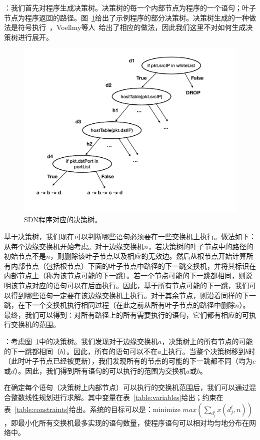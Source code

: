 ：我们首先对程序生成决策树。决策树的每一个内部节点为程序的一个语句；叶子节点为程序返回的路径。图~\ref{fig:dg}给出了示例程序的部分决策树。决策树生成的一种做法是符号执行~\cite{king1976symbolic}，Voellmy等人~\cite{magellan-poster}给出了相应的做法，因此我们这里不对如何生成决策树进行展开。

\begin{figure}[!htbp]
\includegraphics[width=0.8\linewidth]{figures/global-dt.pdf}
\centering
\caption{\small SDN程序对应的决策树。}
\label{fig:dg}
\end{figure}

基于决策树，我们现在可以判断哪些语句必须要在一些交换机上执行。做法如下：从每个边缘交换机开始考虑。对于边缘交换机$n$，若决策树的叶子节点中的路径的初始节点不是$n$，则删除该叶子节点以及相应的无效边。然后从根节点开始计算所有内部节点（包括根节点）下面的叶子节点中路径的下一跳交换机，并将其标识在内部节点上（称为该节点可能的下一跳）。若一个节点可能的下一跳都相同，则说明该节点对应的语句可以在后面执行。因此，基于所有节点可能的下一跳，我们可以得到哪些语句一定要在该边缘交换机上执行。对于其余节点，则沿着同样的下一跳，在下一个交换机执行相同过程（在此之前从所有叶子节点的路径中删除$n$）。最终，我们可以得到：对所有路径上的所有需要执行的语句，它们都有相应的可执行交换机的范围。

：考虑图~\ref{fig:dg}中的决策树。我们发现对于边缘交换机$a$，决策树上的所有节点的可能的下一跳都相同（$b$）。因此，所有的语句可以不在$a$上执行。当整个决策树移到$b$时（此时叶子节点已经被更新），我们发现所有的节点的可能的下一跳都不同（均为$c$或$d$）。因此，我们得到所有语句的可以执行的范围为交换机$a$或$b$。


在确定每个语句（决策树上内部节点）可以执行的交换机范围后，我们可以通过混合整数线性规划进行求解。其中变量在表~\ref{table:variables}给出；约束在表~\ref{table:constraints}给出。系统的目标可以是：minimize $max(\sum_{d_j^i} x(d_j^i, n))$，即最小化所有交换机最多实现的语句数量，使程序语句可以相对均匀地分布在网络中。

